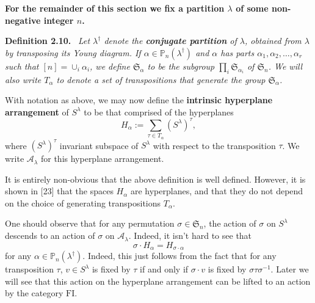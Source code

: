\documentclass[10pt,a4paper]{article}
\newenvironment{sourceblock}[1]{\par\medskip\noindent\textbf{#1.}\ \itshape}{\par\medskip}
\begin{document}
\textbf{For the remainder of this section we fix a partition $\lambda$ of some non-negative integer $n$.}
\begin{sourceblock}{Definition 2.10}
Let $\lambda^\dagger$ denote the \textbf{conjugate partition} of $\lambda$, obtained from $\lambda$ by transposing its Young diagram. If $\alpha\in\mathbb{P}_n(\lambda^\dagger)$ and $\alpha$ has parts $\alpha_1,\alpha_2,\ldots,\alpha_r$ such that $[n]=\cup_i\alpha_i$, we define $\mathfrak{S}_\alpha$ to be the subgroup $\prod_i\mathfrak{S}_{\alpha_i}$ of $\mathfrak{S}_n$. We will also write $T_\alpha$ to denote a set of transpositions that generate the group $\mathfrak{S}_\alpha$.

With notation as above, we may now define the \textbf{intrinsic hyperplane arrangement} of $S^\lambda$ to be that comprised of the hyperplanes
\[
 H_\alpha:=\sum_{\tau\in T_\alpha}(S^\lambda)^\tau,
\]
where $(S^\lambda)^\tau$ invariant subspace of $S^\lambda$ with respect to the transposition $\tau$. We write $\mathcal{A}_\lambda$ for this hyperplane arrangement.
\end{sourceblock}
It is entirely non-obvious that the above definition is well defined. However, it is shown in [23] that the spaces $H_\alpha$ are hyperplanes, and that they do not depend on the choice of generating transpositions $T_\alpha$.

One should observe that for any permutation $\sigma\in\mathfrak{S}_n$, the action of $\sigma$ on $S^\lambda$ descends to an action of $\sigma$ on $\mathcal{A}_\lambda$. Indeed, it isn't hard to see that
\[
 \sigma\cdot H_\alpha=H_{\sigma\cdot\alpha}
\]
for any $\alpha\in\mathbb{P}_n(\lambda^\dagger)$. Indeed, this just follows from the fact that for any transposition $\tau$, $v\in S^\lambda$ is fixed by $\tau$ if and only if $\sigma\cdot v$ is fixed by $\sigma\tau\sigma^{-1}$. Later we will see that this action on the hyperplane arrangement can be lifted to an action by the category $\mathrm{FI}$.
\end{document}
